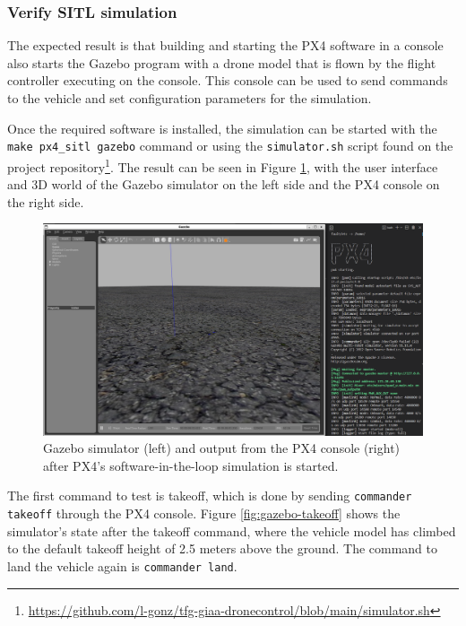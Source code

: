 
\subsubsection{Verify SITL simulation}

The expected result is that building and starting the PX4 software in a console also starts the Gazebo program with a drone model that is flown by the flight controller executing on the console. This console can be used to send commands to the vehicle and set configuration parameters for the simulation.

Once the required software is installed, the simulation can be started with the \texttt{make\ px4\_sitl\ gazebo} command or using the \texttt{simulator.sh} script found on the project repository\footnote{\url{https://github.com/l-gonz/tfg-giaa-dronecontrol/blob/main/simulator.sh}}.
The result can be seen in Figure \ref{fig:gazebo}, with the user interface and 3D world of the Gazebo simulator on the left side and the PX4 console on the right side.


\begin{figure}[H]
  \centering
  \includegraphics[width=\textwidth, keepaspectratio]{img/gazebo.png}
  \caption{Gazebo simulator (left) and output from the PX4 console (right) after PX4's software-in-the-loop simulation is started.}
  \label{fig:gazebo}
\end{figure}

The first command to test is takeoff, which is done by sending \texttt{commander takeoff} through the PX4 console.
Figure \ref{fig:gazebo-takeoff} shows the simulator's state after the takeoff command, where the vehicle model has climbed to the default takeoff height of 2.5 meters above the ground.
The command to land the vehicle again is \texttt{commander land}.

